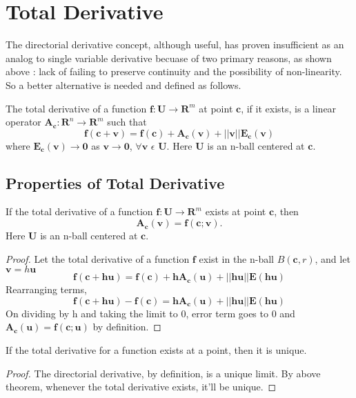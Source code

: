\section{Total Derivative}
The directorial derivative concept, although useful, has proven insufficient as
an analog to single variable derivative becuase of two primary reasons, as shown
above : lack of failing to preserve continuity and the possibility of
non-linearity. So a better alternative is needed and defined as follows.
\begin{definition}
The total derivative of a function  $\bm{f} : \bm{U} \rightarrow \bm{R}^m$ at point
$\bm{c}$, if it exists, is a linear operator $\bm{A_{c}} : \bm{R}^n \rightarrow \bm{R}^m$ such
that
\[
\bm{f(c+v) = f(c) + A_{c}(v) + ||v||E_{c}(v)}
\]
where $\bm{E_{c}(v) \rightarrow 0}$ as $\bm{v\rightarrow 0}$, $\forall \bm{v}$
$\epsilon$ $\bm{U}$. Here $\bm{U}$ is an n-ball centered at $\bm{c}$.
\end{definition}

\subsection{Properties of Total Derivative}
\begin{theorem}
If the total derivative of a function $\bm{f} : \bm{U} \rightarrow \bm{R}^m$
exists at point $\bm{c}$, then
\[
\bm{A_{c}(v) = f(c;v)}.
\]
Here $\bm{U}$ is an n-ball centered at $\bm{c}$.
\end{theorem}
\begin{proof}
    Let the total derivative of a function $\bm{f}$ exist in the n-ball
    $B(\bm{c}, r)$, and let $\bm{v} = h\bm{u}$
    \[
        \bm{f(c+\text{h}u) = f(c) + \text{h}A_c(u) + ||\text{h}u||E(\text{h}u)}
    \]
    Rearranging terms,
    \[
        \bm{f(c+\text{h}u) - f(c) = \text{h}A_c(u) + ||\text{h}u||E(\text{h}u)}
    \]
    On dividing by h and taking the limit to 0, error term goes to 0 and
    $\bm{A_c(u) = f(c;u)}$ by definition.
\end{proof}
\begin{corollary}
If the total derivative for a function exists at a point, then it is unique.
\end{corollary}
\begin{proof}
    The directorial derivative, by definition, is a unique limit. By above
    theorem, whenever the total derivative exists, it'll be unique.
\end{proof}

